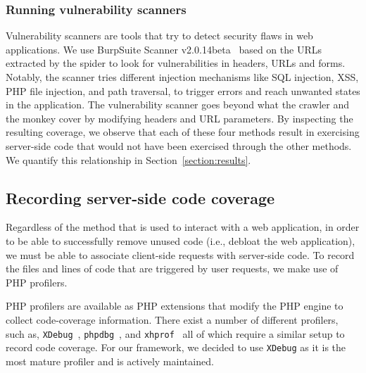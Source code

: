 
\subsubsection{Running vulnerability scanners}
Vulnerability scanners are tools that try to detect security flaws in web applications.
We use BurpSuite Scanner v2.0.14beta~\cite{burpsuite} based on the URLs extracted by the spider to look for vulnerabilities in headers, URLs and forms.
Notably, the scanner tries different injection mechanisms like SQL injection, XSS, PHP file injection, and path traversal, to trigger errors and reach unwanted states in the application.
The vulnerability scanner goes beyond what the crawler and the monkey cover by modifying headers and URL parameters.
By inspecting the resulting coverage, we observe that each of these four methods result in exercising server-side code that would not have been exercised through the other methods. We quantify this relationship in Section~\ref{section:results}.


\subsection{Recording server-side code coverage}
\label{subsec:coverage}

Regardless of the method that is used to interact with a web application,
in order to be able to successfully remove unused code (i.e., debloat the web
application), we must be able to
associate client-side requests with server-side code. To record the files
and lines of code that are triggered by user requests, we make use of PHP
profilers.

PHP profilers are available as PHP extensions that modify the PHP engine to
collect code-coverage information. There exist a number of different profilers,
such as, \texttt{XDebug}~\cite{XDebug}, \texttt{phpdbg}~\cite{phpdbg}, and
\texttt{xhprof}~\cite{xhprof} all of which require a similar setup to record
code coverage. For our framework, we decided to use \texttt{XDebug} as it
is the most mature profiler and is actively maintained.

